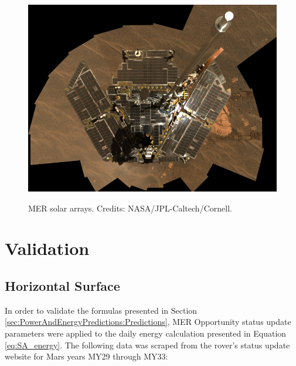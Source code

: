 \begin{figure}[h]
  \centering
  \hypersetup{linkcolor=captionTextColor}
  \includegraphics[width=0.8\linewidth]{sections/power-and-energy-predictions/images/mer-solar-arrays.png}\\
  \caption[MER solar arrays]
          {MER solar arrays. Credits: NASA/JPL-Caltech/Cornell.}
  \label{fig:image:mer-solar-arrays}
\end{figure}

\clearpage
\section{Validation}
\label{sec:PowerAndEnergyPredictions:Validation}


\subsection{Horizontal Surface}
\label{sec:PowerAndEnergyPredictions:Validation:HorizontalSurface}

In order to validate the formulas presented in Section \ref{sec:PowerAndEnergyPredictions:Predictions}, MER Opportunity status update parameters were applied to the daily energy calculation presented in Equation \ref{eq:SA_energy}. The following data was scraped from the rover's status update website for Mars years MY29 through MY33:


